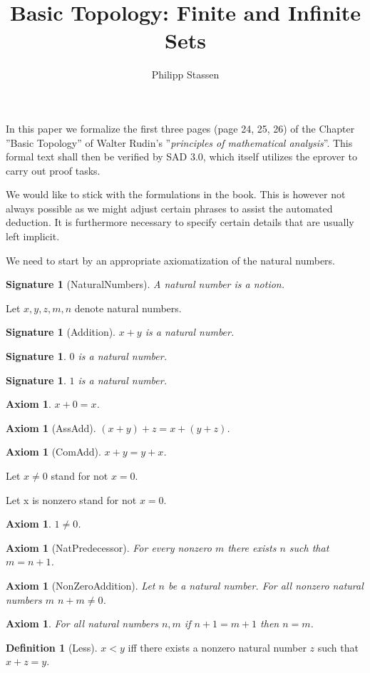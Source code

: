 \documentclass[10pt]{article}
\title{Basic Topology: Finite and Infinite Sets}
\author{Philipp Stassen}
\newenvironment{forthel}{\begin{leftbar}}{\end{leftbar}}
\theoremstyle{definition}
\newtheorem{definition}[theorem]{Definition}
\theoremstyle{plain}
\newtheorem{signature}[theorem]{Signature}
\newtheorem{axiom}[theorem]{Axiom}
\theoremstyle{remark}
\begin{document}
\maketitle
In this paper we formalize the first three pages (page 24, 25, 26) of the Chapter ''Basic Topology'' of Walter Rudin's ''\emph{principles of mathematical analysis}''. 
This formal text shall then be verified by SAD 3.0, which itself utilizes the eprover to carry out proof tasks.

We would like to stick with the formulations in the book. This is however not always possible as we might adjust certain phrases to assist the automated deduction. It is furthermore necessary to specify certain details that are usually left implicit.

We need to start by an appropriate axiomatization of the natural numbers.
\begin{forthel}
[set/-s] [element/-s] [subset/-s] [sequence/-s] [number/-s]
	\begin{signature}[NaturalNumbers]
		A natural number is a notion.
	\end{signature}
	Let $x,y,z,m,n$ denote natural numbers.
	\begin{signature}[Addition]
		$x + y$ is a natural number.
	\end{signature}
	\begin{signature}
		$0$ is a natural number.
	\end{signature}
	\begin{signature}
		$1$ is a natural number.
	\end{signature}
	\begin{axiom}
		$x + 0 = x$.
	\end{axiom}
	\begin{axiom}[AssAdd]
	 	$(x+y)+z=x+(y+z)$.
	\end{axiom}
	\begin{axiom}[ComAdd]
		$x+y=y+x$.
	\end{axiom}
	Let $x \neq 0$ stand for not $x=0$.

	Let x is nonzero stand for not $x=0$.
	\begin{axiom}
		$1 \neq 0$.
	\end{axiom}
	\begin{axiom}[NatPredecessor]
		For every nonzero $m$ there exists $n$ such that $m = n+1$.
	\end{axiom}
	\begin{axiom}[NonZeroAddition]
		Let $n$ be a natural number. For all nonzero natural numbers $m$ $n+m \neq 0$.
	\end{axiom}
	\begin{axiom}
		For all natural numbers $n,m$ if $n+1=m+1$ then $n=m$.
	\end{axiom}
	\begin{definition}[Less]
		$x<y$ iff there exists a nonzero natural number $z$ such that $x+z=y$.
	\end{definition}
\end{forthel}
\end{document}
